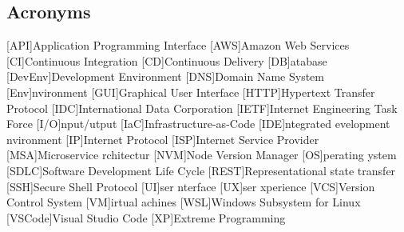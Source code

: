 \newcommand{\abbr}{Abbreviations}
\subsection{Acronyms}

\begin{acronym}[1234567890]		%
\setlength{\itemsep}{-\parsep}	%

[API]{Application Programming Interface}
[AWS]{Amazon Web Services}
[CI]{Continuous Integration}
[CD]{Continuous Delivery}
[DB]{atabase}
[DevEnv]{Development Environment}
[DNS]{Domain Name System}
[Env]{nvironment}
[GUI]{Graphical User Interface}
[HTTP]{Hypertext Transfer Protocol}
[IDC]{International Data Corporation}
[IETF]{Internet Engineering Task Force}
[I/O]{nput/utput}
[IaC]{Infrastructure-as-Code}
[IDE]{ntegrated evelopment nvironment}
[IP]{Internet Protocol}
[ISP]{Internet Service Provider}
[MSA]{Microservice rchitectur}
[NVM]{Node Version Manager}
[OS]{perating ystem}
[SDLC]{Software Development Life Cycle}
[REST]{Representational state transfer}
[SSH]{Secure Shell Protocol}
[UI]{ser nterface}
[UX]{ser xperience}
[VCS]{Version Control System}
[VM]{irtual achines}
[WSL]{Windows Subsystem for Linux}
[VSCode]{Visual Studio Code}
[XP]{Extreme Programming}
\end{acronym}
